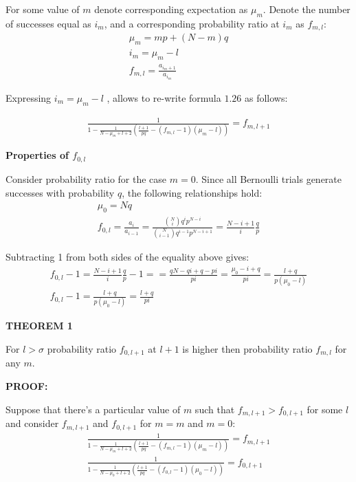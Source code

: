 \documentclass[11pt,draft]{article}
\begin{document}
For some value of $m$ denote corresponding expectation as $\mu_m$.  Denote the number of successes equal as $i_m$, and a corresponding probability ratio at $i_m$ as $f_{m,l}$:
\begin{align}
\mu_m = mp + (N-m)q\\ 
i_m = \mu_m - l \\
f_{m,l} = \frac{a_{{i_m+1}}}{a_{i_m}}
\end{align}

Expressing $i_m=\mu_m-l$ , allows to re-write formula $1.26$  as follows:

\begin{align}
\frac{  1 }{ 1  - \frac{1}{N- \mu_m + l + 2}\left (\frac{l+1}{pq} - (f_{m,l} - 1)(\mu_m-l) \right ) }  = f_{m,l+1} 
\end{align}


\textbf{Properties of $f_{0,l}$}

Consider probability ratio for the case $m=0$.  Since all Bernoulli trials generate successes with probability $q$, the following relationships hold:
\begin{align}
\mu_0 = Nq \\
f_{0,l} = \frac{a_{i}}{a_{i-1}} = \frac{\binom{N}{i} q^{i}p^{N-i }}{\binom{N}{i-1} q^{i-1}p^{N-i+1}} = \frac{N-i+1}{i}\frac{q}{p} 
\end{align}

Subtracting 1 from both sides of the equality above gives:
\begin{align}
f_{0,l} -1 =   \frac{N-i+1}{i}\frac{q}{p}  - 1 =  = \frac{qN - qi + q - pi}{pi} = \frac{\mu_0 - i + q}{pi} = \frac{l + q}{p(\mu_0 - l)} \\
f_{0,l} -1 =   \frac{l + q}{p(\mu_0 - l)} =  \frac{l + q}{pi}
\end{align}


\textbf{THEOREM 1}
 
For $l > \sigma$ probability ratio $f_{0,l+1}$ at $l+1$ is higher then probability ratio $f_{m,l}$ for any $m$.

\textbf{PROOF:}

Suppose that there's a particular value of $m$ such that $f_{m,{l+1}}  > f_{0,{l+1}}$  for some $l$ and consider $f_{m,{l+1}}$ and $f_{0,{l+1}}$ for $m=m$ and $m=0$:
\begin{align}
\frac{  1 }{ 1  - \frac{1}{N- \mu_m + l + 2}\left (\frac{l+1}{pq} - (f_{m,l} - 1)(\mu_m-l) \right ) }  = f_{m,l+1} \\
\frac{  1 }{ 1  - \frac{1}{N- \mu_0 + l + 2}\left (\frac{l+1}{pq} - (f_{0,l} - 1)(\mu_0-l) \right ) }  = f_{0,l+1} 
\end{align}
\end{document}
